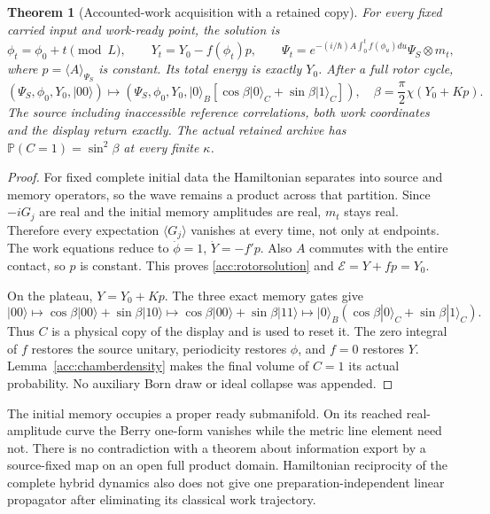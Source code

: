 \documentclass[11pt,oneside,openany]{book}
\newtheorem{theorem}{Theorem}[chapter]
\theoremstyle{definition}
\theoremstyle{remark}\newtheorem{remark}[theorem]{Remark}
\begin{document}
\begin{theorem}[Accounted-work acquisition with a retained copy]\label{acc:rotor}
For every fixed carried input and work-ready point, the solution is
\begin{equation}
 \phi_t=\phi_0+t\pmod L,\qquad
 Y_t=Y_0-f(\phi_t)p,\qquad
 \Psi_t=e^{-(i/\hbar)A\int_0^tf(\phi_u)du}\Psi_S\otimes m_t,
 \label{acc:rotorsolution}
\end{equation}
where $p=\langle A\rangle_{\Psi_S}$ is constant.
Its total energy is exactly $Y_0$. After a full rotor cycle,
\begin{equation}
(\Psi_S,\phi_0,Y_0,\lvert00\rangle)\longmapsto
 (\Psi_S,\phi_0,Y_0,
 \lvert0\rangle_B[\cos\beta\lvert0\rangle_C+
 \sin\beta\lvert1\rangle_C]),
 \quad \beta=\frac\pi2\chi(Y_0+Kp).
 \label{acc:rotorreturn}
\end{equation}
The source including inaccessible reference correlations, both work
coordinates and the display return exactly. The actual retained archive
has $\mathbb P(C=1)=\sin^2\beta$ at every finite $\kappa$.
\end{theorem}
\begin{proof}
For fixed complete initial data the Hamiltonian separates into source and
memory operators, so the wave remains a product across that partition.
Since $-iG_j$ are real and the initial memory amplitudes are real, $m_t$
stays real. Therefore every expectation $\langle G_j\rangle$ vanishes
at every time, not only at endpoints. The work equations reduce to
$\dot\phi=1$, $\dot Y=-f'p$. Also $A$ commutes with the entire contact,
so $p$ is constant. This proves \eqref{acc:rotorsolution} and
$\mathcal E=Y+fp=Y_0$.

On the plateau, $Y=Y_0+Kp$. The three exact memory gates give
\[
 |00\rangle\longmapsto
 \cos\beta|00\rangle+\sin\beta|10\rangle
 \longmapsto\cos\beta|00\rangle+\sin\beta|11\rangle
 \longmapsto|0\rangle_B(\cos\beta|0\rangle_C+\sin\beta|1\rangle_C).
\]
Thus $C$ is a physical copy of the display and is used to reset it.
The zero integral of $f$ restores the source unitary, periodicity restores
$\phi$, and $f=0$ restores $Y$. Lemma~\ref{acc:chamberdensity} makes the
final volume of $C=1$ its actual probability. No auxiliary Born draw or
ideal collapse was appended.
\end{proof}

The initial memory occupies a proper ready submanifold. On its reached
real-amplitude curve the Berry one-form vanishes while the metric line
element need not. There is no contradiction with a theorem about
information export by a source-fixed map on an open full product domain.
Hamiltonian reciprocity of the complete hybrid dynamics also does not give
one preparation-independent linear propagator after eliminating its
classical work trajectory.
\end{document}
